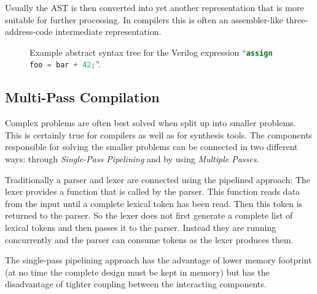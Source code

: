 Usually the AST is then converted into yet another representation that is more suitable for further processing.
In compilers this is often an assembler-like three-address-code intermediate representation. \cite{Dragonbook}

\begin{figure}[t]
	\hfil
	\caption{Example abstract syntax tree for the Verilog expression ``\lstinline[language=Verilog]{assign foo = bar + 42;}''.}
	\label{fig:Basics_ast}
\end{figure}

\subsection{Multi-Pass Compilation}

Complex problems are often best solved when split up into smaller problems. This is certainly true
for compilers as well as for synthesis tools. The components responsible for solving the smaller problems can
be connected in two different ways: through {\it Single-Pass Pipelining} and by using {\it Multiple Passes}.

Traditionally a parser and lexer are connected using the pipelined approach: The lexer provides a function that
is called by the parser. This function reads data from the input until a complete lexical token has been read. Then
this token is returned to the parser. So the lexer does not first generate a complete list of lexical tokens
and then passes it to the parser. Instead they are running concurrently and the parser can consume tokens as
the lexer produces them.

The single-pass pipelining approach has the advantage of lower memory footprint (at no time the complete design
must be kept in memory) but has the disadvantage of tighter coupling between the interacting components.

